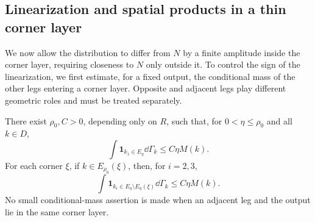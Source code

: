 \subsection{Linearization and spatial products in a thin corner layer}

We now allow the distribution to differ from $N$ by a finite amplitude
inside the corner layer, requiring closeness to $N$ only outside it.
To control the sign of the linearization, we first estimate, for a fixed
output, the conditional mass of the other legs entering a corner layer.
Opposite and adjacent legs play different geometric roles and must be
treated separately.
\begin{lemma}\label{geom:roles}
There exist $\rho_0,C>0$, depending only on $R$, such that, for
$0<\eta\le\rho_0$ and all $k\in D$,
\begin{equation}\label{geom:oppositerole}
 \int\mathbf1_{k_1\in E_\eta}\dd\Gamma_k\le C\eta M(k).
\end{equation}
For each corner $\xi$, if $k\in E_{\rho_0}(\xi)$, then, for $i=2,3$,
\begin{equation}\label{geom:wrongcorner}
 \int\mathbf1_{k_i\in E_\eta\setminus E_\eta(\xi)}\dd\Gamma_k
       \le C\eta M(k).
\end{equation}
No small conditional-mass assertion is made when an adjacent leg and
the output lie in the same corner layer.
\end{lemma}
